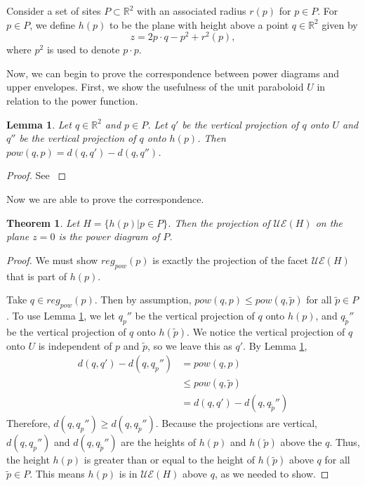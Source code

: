 \documentclass[a4paper, 11pt]{article}
\newtheorem{theorem}{Theorem}[section]
\newtheorem{lemma}{Lemma}[section]
\newcommand{\R}{\mathbb{R}}
\begin{document}
Consider a set of sites $P \subset \R^2$ with an associated radius $r(p)$ for $p \in P$. For $p \in P$, we define $h(p)$ to be the plane with height above a point
$q \in \R^2$ given by
\[ z = 2 p \cdot q - p^2 + r^2(p) ,\]
where $p^2$ is used to denote $p \cdot p$.

Now, we can begin to prove the correspondence between power diagrams and upper envelopes. First, we show the usefulness of the unit paraboloid $U$ in
relation to the power function.

\begin{lemma}
  \label{lem:proj}
  Let $q \in \R^2$ and $p \in P$. Let $q'$ be the vertical projection of $q$ onto $U$ and $q''$ be the vertical projection of $q$ onto $h(p)$. Then
  $pow(q, p) = d(q, q') - d(q, q'')$.
\end{lemma}
\begin{proof}
  See \cite{aurenhammer_power}
\end{proof}

Now we are able to prove the correspondence.

\begin{theorem}
  Let $H = \{ h(p) | p \in P \}$. Then the projection of $\mathcal{UE}(H)$ on the plane $z=0$ is the power diagram of $P$.
\end{theorem}
\begin{proof}
  We must show $reg_{pow}(p)$ is exactly the projection of the facet $\mathcal{UE}(H)$ that is part of $h(p)$.

  Take $q \in reg_{pow}(p)$. Then by assumption, $pow(q,p) \leq pow(q,\tilde{p})$ for all $\tilde{p} \in P$. To use Lemma \ref{lem:proj}, we let $q_p''$ be the
  vertical projection of $q$ onto $h(p)$, and $q_{\tilde{p}}''$ be the vertical projection of $q$ onto $h(\tilde{p})$. We notice the vertical projection
  of $q$ onto $U$ is independent of $p$ and $\tilde{p}$, so we leave this as $q'$. By Lemma \ref{lem:proj},
  \begin{align*}
    d(q,q') - d(q,q_p'') &= pow(q,p) \\
    &\leq pow(q,\tilde{p}) \\
    &= d(q,q') - d(q,q_{\tilde{p}}'')
  \end{align*}
  Therefore, $d(q,q_p'') \geq d(q, q_{\tilde{p}}'')$. Because the projections are vertical, $d(q,q_p'')$ and $d(q, q_{\tilde{p}}'')$ are the heights of
  $h(p)$ and $h(\tilde{p})$ above the $q$. Thus, the height $h(p)$ is greater than or equal to the height of $h(\tilde{p})$ above $q$ for all
  $\tilde{p} \in P$. This means $h(p)$ is in $\mathcal{UE}(H)$ above $q$, as we needed to show.
\end{proof}
\end{document}
